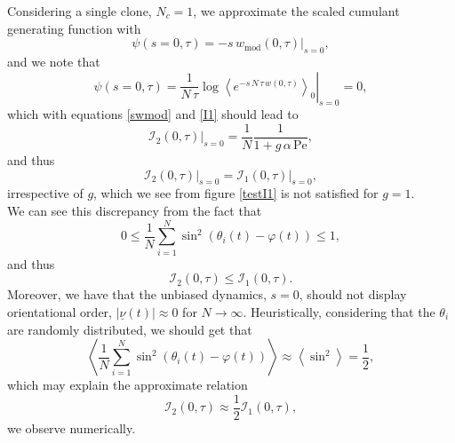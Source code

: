 \documentclass[10pt]{article}
\begin{document}
Considering a single clone, $N_c = 1$, we approximate the scaled cumulant generating function with
\begin{equation}
\psi(s=0, \tau) = \left. - s \, w_{\text{mod}}(0, \tau)\right|_{s=0},
\end{equation}
and we note that
\begin{equation}
\psi(s=0, \tau) = \left.\frac{1}{N \, \tau} \log\left<e^{-s \, N \, \tau \, w(0, \tau)}\right>_0\right|_{s=0} = 0,
\end{equation}
which with equations \ref{swmod} and \ref{I1} should lead to
\begin{equation}
\left. \mathcal{I}_2(0, \tau) \right|_{s=0} = \frac{1}{N} \frac{1}{1 + g \, \alpha \, \text{Pe}},
\end{equation}
and thus
\begin{equation}
\left. \mathcal{I}_2(0, \tau) \right|_{s=0} = \left. \mathcal{I}_1(0, \tau) \right|_{s=0},
\end{equation}
irrespective of $g$, which we see from figure \ref{testI1} is not satisfied for $g = 1$.\\

We can see this discrepancy from the fact that
\begin{equation}
0 \leq \frac{1}{N} \sum_{i=1}^N \sin^2(\theta_i(t) - \varphi(t)) \leq 1,
\end{equation}
and thus
\begin{equation}
\mathcal{I}_2(0, \tau) \leq \mathcal{I}_1(0, \tau).
\end{equation}
Moreover, we have that the unbiased dynamics, $s = 0$, should not display orientational order, $|\underline{\nu}(t)| \approx 0$ for $N \rightarrow \infty$. Heuristically, considering that the $\theta_i$ are randomly distributed, we should get that
\begin{equation}
\left<\frac{1}{N} \sum_{i=1}^N \sin^2(\theta_i(t) - \varphi(t)) \right> \approx \left<\sin^2\right> = \frac{1}{2},
\end{equation}
which may explain the approximate relation
\begin{equation}
\mathcal{I}_2(0, \tau) \approx \frac{1}{2} \mathcal{I}_1(0, \tau),
\end{equation}
we observe numerically.
\end{document}
